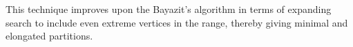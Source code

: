 %
%
%
%
%
%
%
%
%
%
%
This technique improves upon the Bayazit's algorithm \cite{Bayazit} in terms of expanding search to include even extreme vertices in the range, thereby giving minimal and elongated partitions.
%
%
%



